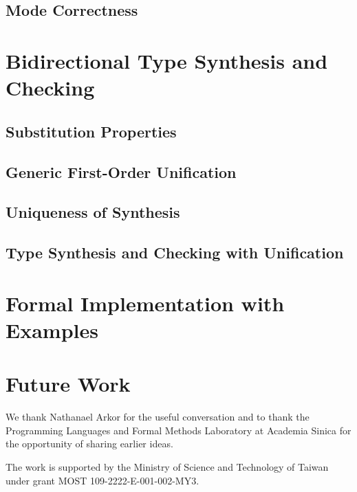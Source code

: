 \documentclass[acmsmall]{acmart}
\begin{document}
\subsection{Mode Correctness}

\section{Bidirectional Type Synthesis and Checking}
\subsection{Substitution Properties}
\subsection{Generic First-Order Unification}
\cite{McBride2003,McBride2003a}
\subsection{Uniqueness of Synthesis}

\subsection{Type Synthesis and Checking with Unification}

\section{Formal Implementation with Examples}

\citep{Xie2018}

\section{Future Work}
\begin{acks}
We thank Nathanael Arkor for the useful conversation and to thank the Programming Languages and Formal Methods Laboratory at Academia Sinica for the opportunity of sharing earlier ideas.

The work is supported by the Ministry of Science and Technology of Taiwan under grant MOST 109-2222-E-001-002-MY3.
\end{acks}



\end{document}
